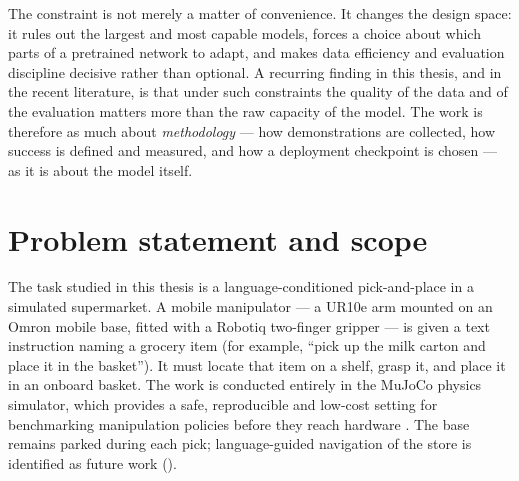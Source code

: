 The constraint is not merely a matter of convenience. It changes the design space:
it rules out the largest and most capable models, forces a choice about which parts
of a pretrained network to adapt, and makes data efficiency and evaluation
discipline decisive rather than optional. A recurring finding in this thesis, and in
the recent literature, is that under such constraints the quality of the data and of
the evaluation matters more than the raw capacity of the model. The work is
therefore as much about \emph{methodology} --- how demonstrations are collected, how
success is defined and measured, and how a deployment checkpoint is chosen --- as it
is about the model itself.

\section{Problem statement and scope}
\label{sec:problem}
The task studied in this thesis is a language-conditioned pick-and-place in a
simulated supermarket. A mobile manipulator --- a UR10e arm mounted on an Omron
mobile base, fitted with a Robotiq two-finger gripper --- is given a text
instruction naming a grocery item (for example, ``pick up the milk carton and
place it in the basket''). It must locate that item on a shelf, grasp it, and
place it in an onboard basket. The work is conducted entirely in the MuJoCo
physics simulator, which provides a safe, reproducible and low-cost setting for
benchmarking manipulation policies before they reach hardware
\parencite{todorov2012mujoco, nasiriany2024robocasa}. The base remains parked
during each pick; language-guided navigation of the store is identified as future
work ().

